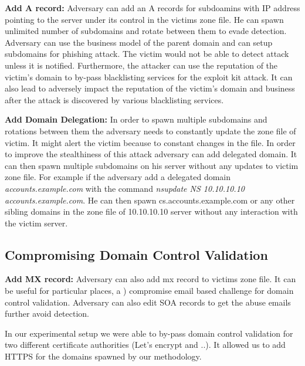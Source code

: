 \textbf{Add A record:} 
Adversary can add an A records for subdoamins with IP address pointing to the server under its control in the victims zone file. He can spawn unlimited number of subdomains and rotate between them to evade detection. Adversary can use the business model of the parent domain and can setup subdomains for phishing attack. The victim would not be able to detect attack unless it is notified. Furthermore, the attacker can use the reputation of the victim's domain to by-pass blacklisting services for the exploit kit attack. It can also lead to adversely impact the reputation of the victim's domain and business after the attack is discovered by various blacklisting services.

\textbf{Add Domain Delegation:}
In order to spawn multiple subdomains and rotations between them the adversary needs to constantly update the zone file of victim. It might alert the victim because to constant changes in the file. In order to improve the stealthiness of this attack adversary can add delegated domain. It can then spawn multiple subdomains on his server without any updates to victim zone file. For example if the adversary add a delegated domain
\textit{accounts.example.com} with the command %
\textit{nsupdate NS 10.10.10.10 accounts.example.com}. He can then spawn cs.accounts.example.com or any other sibling domains in the zone file of 10.10.10.10 server without any interaction with the victim server. 




\subsection{Compromising Domain Control Validation}


\textbf{ Add MX record:} 
Adversary can also add mx record to victims zone file. It can be useful for particular places, a ) compromise email based challenge for domain control validation. Adversary can also edit SOA records to get the abuse emails further avoid detection.


In our experimental setup we were able to by-pass domain control validation for two different certificate authorities (Let's encrypt and ..). It allowed us to add HTTPS for the domains spawned by our methodology. 

